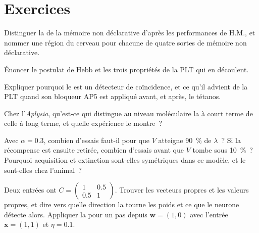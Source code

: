 \section{Exercices}

\begin{exercise}[$\star$]\label{exo:b3:learning-memory:1}
Distinguer la  de la mémoire non déclarative d'après
les performances de H.M., et nommer une région du cerveau pour chacune
de quatre sortes de mémoire non déclarative.
\end{exercise}

\begin{exercise}[$\star$]\label{exo:b3:learning-memory:2}
Énoncer le postulat de Hebb et les trois propriétés de la PLT qui en
découlent.
\end{exercise}

\begin{exercise}[$\star$]\label{exo:b3:learning-memory:3}
Expliquer pourquoi le  est un détecteur de coïncidence, et
ce qu'il advient de la PLT quand son bloqueur AP5 est appliqué avant, et
après, le tétanos.
\end{exercise}

\begin{exercise}[$\star$]\label{exo:b3:learning-memory:4}
Chez l'\emph{Aplysia}, qu'est-ce qui distingue au niveau moléculaire la
 à court terme de celle à long terme, et quelle
expérience le montre~?
\end{exercise}

\begin{exercise}[$\star\star$]\label{exo:b3:learning-memory:5}
Avec $\alpha = 0.3$, combien d'essais faut-il pour que $V$ atteigne
\qty{90}{\%} de $\lambda$~? Si la récompense est ensuite retirée,
combien d'essais avant que $V$ tombe sous \qty{10}{\%}~? Pourquoi
acquisition et extinction sont-elles symétriques dans ce modèle, et le
sont-elles chez l'animal~?
\end{exercise}

\begin{exercise}[$\star\star$]\label{exo:b3:learning-memory:6}
Deux entrées ont $C = \begin{pmatrix}1 & 0.5\\ 0.5 & 1\end{pmatrix}$.
Trouver les vecteurs propres et les valeurs propres, et dire vers quelle
direction la  tourne les poids et ce que le neurone détecte
alors. Appliquer la  pour un pas depuis
$\mathbf{w} = (1,0)$ avec l'entrée $\mathbf{x}
= (1,1)$ et $\eta = 0.1$.
\end{exercise}

